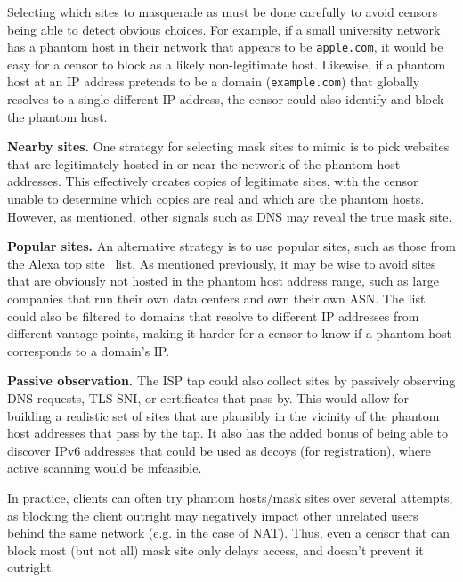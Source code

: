 \documentclass[sigconf]{acmart}
\renewcommand{\paragraph}[1]{\smallskip\noindent\textbf{#1\quad}}
\begin{document}
Selecting which sites to masquerade as must be done carefully to avoid censors
being able to detect obvious choices. For example, if a small university network
has a phantom host in their network that appears to be \texttt{apple.com}, it
would be easy for a censor to block as a likely non-legitimate host. Likewise,
if a phantom host at an IP address pretends to be a domain (\texttt{example.com}) that
globally resolves to a single different IP address, the censor could also
identify and block the phantom host.

\paragraph{Nearby sites.}
One strategy for selecting mask sites to mimic is to pick websites that are
legitimately hosted in or near the network of the phantom host addresses. This
effectively creates copies of legitimate sites, with the censor unable to
determine which copies are real and which are the phantom hosts. However, as
mentioned, other signals such as DNS may reveal the true mask site.

\paragraph{Popular sites.}
An alternative strategy is to use popular sites, such as those from the Alexa
top site~\cite{alexa-top500} list. As mentioned previously, it may be wise to avoid
sites that are obviously not hosted in the phantom host address range, such as
large companies that run their own data centers and own their own ASN.
The list could also be filtered to domains that resolve to different IP
addresses from different vantage points, making it harder for a censor to know
if a phantom host corresponds to a domain's IP.

\paragraph{Passive observation.}
The ISP tap could also collect sites by passively observing DNS requests, TLS
SNI, or certificates that pass by. This would allow for building a realistic set
of sites that are plausibly in the vicinity of the phantom host addresses
that pass by the tap. It also has the added bonus of being able to discover
IPv6 addresses that could be used as decoys (for registration), where active
scanning would be infeasible.

In practice, clients can often try phantom hosts/mask sites over
several attempts, as blocking the client outright may negatively impact other
unrelated users behind the same network (e.g. in the case of NAT). Thus, even a
censor that can block most (but not all) mask site only delays access, and
doesn't prevent it outright.
\end{document}
